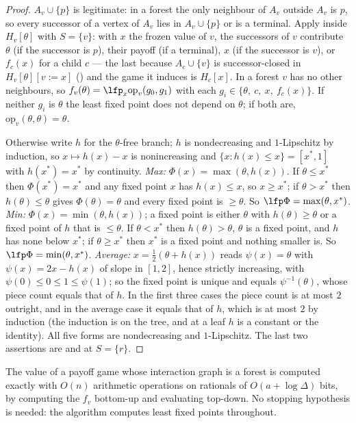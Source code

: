 \begin{proof}
$A_v\cup\{p\}$ is legitimate: in a forest the only neighbour of $A_v$ outside
$A_v$ is $p$, so every successor of a vertex of $A_v$ lies in $A_v\cup\{p\}$ or
is a terminal. Apply  inside $H_v[\theta]$ with $S=\{v\}$: with
$x$ the frozen value of $v$, the successors of $v$ contribute $\theta$ (if the
successor is $p$), their payoff (if a terminal), $x$ (if the successor is $v$),
or $f_c(x)$ for a child $c$ --- the last because $A_c\cup\{v\}$ is
successor-closed in $H_v[\theta][v{:=}x]$ () and the
game it induces is $H_c[x]$. In a forest $v$ has no other neighbours, so
$f_v(\theta)=\lfp_x\mathrm{op}_v(g_0,g_1)$ with each $g_i\in\{\theta,\ c,\ x,\
f_c(x)\}$. If neither $g_i$ is $\theta$ the least fixed point does not depend on
$\theta$; if both are, $\mathrm{op}_v(\theta,\theta)=\theta$.

Otherwise write $h$ for the $\theta$-free branch; $h$ is nondecreasing and
$1$-Lipschitz by induction, so $x\mapsto h(x)-x$ is nonincreasing and
$\{x:h(x)\le x\}=[x^{\ast},1]$ with $h(x^{\ast})=x^{\ast}$ by continuity.
\emph{Max:} $\Phi(x)=\max(\theta,h(x))$. If $\theta\le x^{\ast}$ then
$\Phi(x^{\ast})=x^{\ast}$ and any fixed point $x$ has $h(x)\le x$, so
$x\ge x^{\ast}$; if $\theta>x^{\ast}$ then $h(\theta)\le\theta$ gives
$\Phi(\theta)=\theta$ and every fixed point is $\ge\theta$. So
$\lfp\Phi=\max(\theta,x^{\ast})$.
\emph{Min:} $\Phi(x)=\min(\theta,h(x))$; a fixed point is either $\theta$ with
$h(\theta)\ge\theta$ or a fixed point of $h$ that is $\le\theta$. If
$\theta<x^{\ast}$ then $h(\theta)>\theta$, $\theta$ is a fixed point, and $h$
has none below $x^{\ast}$; if $\theta\ge x^{\ast}$ then $x^{\ast}$ is a fixed
point and nothing smaller is. So $\lfp\Phi=\min(\theta,x^{\ast})$.
\emph{Average:} $x=\tfrac12(\theta+h(x))$ reads $\psi(x)=\theta$ with
$\psi(x)=2x-h(x)$ of slope in $[1,2]$, hence strictly increasing, with
$\psi(0)\le0\le1\le\psi(1)$; so the fixed point is unique and equals
$\psi^{-1}(\theta)$, whose piece count equals that of $h$.
In the first three cases the piece count is at most $2$ outright, and in the
average case it equals that of $h$, which is at most $2$ by induction (the
induction is on the tree, and at a leaf $h$ is a constant or the identity). All
five forms are nondecreasing and $1$-Lipschitz. The last two assertions are
\Cref{lem:successor-closed} and \Cref{lem:cut} at $S=\{r\}$.
\end{proof}

\begin{theorem}\label{wa:forest-poly}
The value of a payoff game whose interaction graph is a forest is computed
exactly with $O(n)$ arithmetic operations on rationals of $O(a+\log\Delta)$
bits, by computing the $f_v$ bottom-up and evaluating top-down. No stopping
hypothesis is needed: the algorithm computes least fixed points throughout.
\end{theorem}

